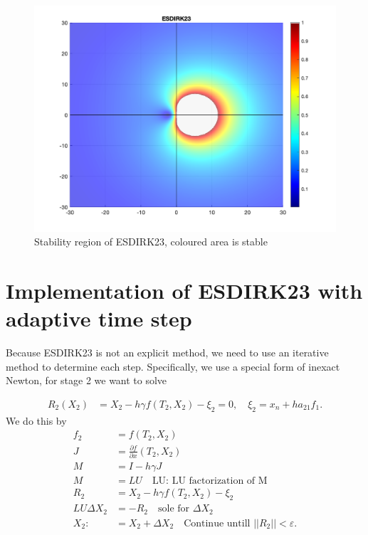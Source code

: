 \begin{figure}[H]
    \centering
    \includegraphics[width=\textwidth]{graphics/opg7/ESDIRK23-stability.png}
    \caption{Stability region of ESDIRK23, coloured area is stable}
    \label{fig7:stable}
\end{figure}

\section{Implementation of ESDIRK23 with adaptive time step}
Because ESDIRK23 is not an explicit method, we need to use an iterative method to determine each step. Specifically, we use a special form of inexact Newton, for stage 2 we want to solve

\begin{align}
    R_2(X_2) &= X_2 - h \gamma f(T_2,X_2) - \xi_2 = 0, \quad \xi_2 = x_n + h a_{21} f_1.
\end{align}
We do this by
\begin{align}
    f_2 &= f(T_2,X_2) \\
    J &= \frac{\partial f}{\partial x} (T_2,X_2) \\
    M &= I - h \gamma J \\
    M &= LU  \quad \text{LU: LU factorization of M} \\
    R_2 &= X_2 - h \gamma f(T_2,X_2) - \xi_2 \\
    LU \Delta X_2 &= -R_2 \quad \text{sole for $\Delta X_2$} \\
    X_2 :&= X_2 + \Delta X_2  \quad \text{Continue untill $||R_2|| < \varepsilon$}.
\end{align}

